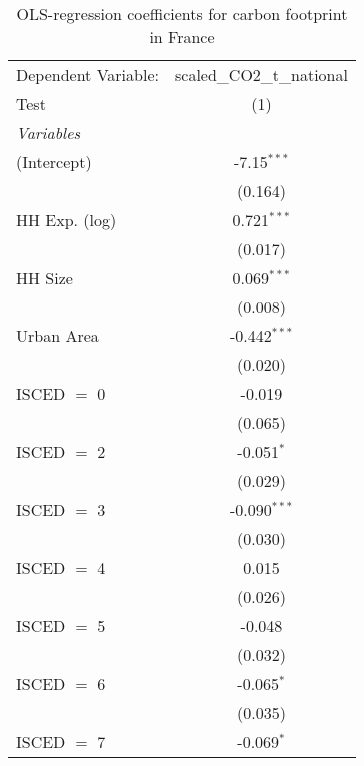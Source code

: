
\begin{table}[htbp!]
   \centering
   \small
   \begin{adjustbox}{width = 1\textwidth, max height = 0.95\textheight, center}
      \begin{threeparttable}[b]
         \caption{\label{tab:OLS_2_FRA} OLS-regression coefficients for carbon footprint in France}
         \begin{tabular}{lc}
            \tabularnewline \midrule \midrule
            Dependent Variable: & scaled\_CO2\_t\_national\\     
            Test                & (1)\\  
            \midrule
            \emph{Variables}\\
            (Intercept)         & -7.15$^{***}$\\   
                                & (0.164)\\   
            HH Exp. (log)       & 0.721$^{***}$\\   
                                & (0.017)\\   
            HH Size             & 0.069$^{***}$\\   
                                & (0.008)\\   
            Urban Area          & -0.442$^{***}$\\   
                                & (0.020)\\   
            ISCED $=$ 0         & -0.019\\   
                                & (0.065)\\   
            ISCED $=$ 2         & -0.051$^{*}$\\   
                                & (0.029)\\   
            ISCED $=$ 3         & -0.090$^{***}$\\   
                                & (0.030)\\   
            ISCED $=$ 4         & 0.015\\   
                                & (0.026)\\   
            ISCED $=$ 5         & -0.048\\   
                                & (0.032)\\   
            ISCED $=$ 6         & -0.065$^{*}$\\   
                                & (0.035)\\   
            ISCED $=$ 7         & -0.069$^{*}$\\   

\end{tabular}
\end{threeparttable}
\end{adjustbox}
\end{table}
